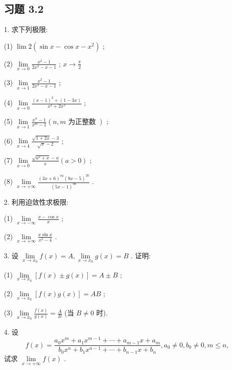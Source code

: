 \subsection{习题 3.2}

1. 求下列极限:

(1) \(\lim 2\left( {\sin x - \cos x - {x}^{2}}\right)\) ;

(2) \(\mathop{\lim }\limits_{{x \rightarrow  0}}\frac{{x}^{2} - 1}{2{x}^{2} - x - 1}\) ; \(x \rightarrow  \frac{\pi }{2}\)

(3) \(\mathop{\lim }\limits_{{x \rightarrow  1}}\frac{{x}^{2} - 1}{2{x}^{2} - x - 1}\) ;

(4) \(\mathop{\lim }\limits_{{x \rightarrow  0}}\frac{{\left( x - 1\right) }^{3} + \left( {1 - {3x}}\right) }{{x}^{2} + 2{x}^{3}}\) ;

(5) \(\mathop{\lim }\limits_{{x \rightarrow  1}}\frac{{x}^{n} - 1}{{x}^{m} - 1}\left( {n,m\text{ 为正整数 }}\right)\) ;

(6) \(\mathop{\lim }\limits_{{x \rightarrow  4}}\frac{\sqrt{1 + {2x}} - 3}{\sqrt{x} - 2}\) ;

(7) \(\mathop{\lim }\limits_{{x \rightarrow  0}}\frac{\sqrt{{a}^{2} + x} - a}{x}\left( {a > 0}\right)\) ;

(8) \(\mathop{\lim }\limits_{{x \rightarrow   + \infty }}\frac{{\left( 3x + 6\right) }^{70}{\left( 8x - 5\right) }^{20}}{{\left( 5x - 1\right) }^{90}}\) .

2. 利用迫敛性求极限:

(1) \(\mathop{\lim }\limits_{{x \rightarrow   - \infty }}\frac{x - \cos x}{x}\) ;

(2) \(\mathop{\lim }\limits_{{x \rightarrow   + \infty }}\frac{x\sin x}{{x}^{2} - 4}\) .

3. 设 \(\mathop{\lim }\limits_{{x \rightarrow  {x}_{0}}}f\left( x\right)  = A,\mathop{\lim }\limits_{{x \rightarrow  {x}_{0}}}g\left( x\right)  = B\) . 证明:

(1) \(\mathop{\lim }\limits_{{x \rightarrow  {x}_{0}}}\left\lbrack  {f\left( x\right)  \pm  g\left( x\right) }\right\rbrack   = A \pm  B\) ;

(2) \(\mathop{\lim }\limits_{{x \rightarrow  {x}_{0}}}\left\lbrack  {f\left( x\right) g\left( x\right) }\right\rbrack   = {AB}\) ;

(3) \(\mathop{\lim }\limits_{{x \rightarrow  {x}_{0}}}\frac{f\left( x\right) }{g\left( x\right) } = \frac{A}{B}\) (当 \(B \neq  0\) 时).

4. 设
\[
f\left( x\right)  = \frac{{a}_{0}{x}^{m} + {a}_{1}{x}^{m - 1} + \cdots  + {a}_{m - 1}x + {a}_{m}}{{b}_{0}{x}^{n} + {b}_{1}{x}^{n - 1} + \cdots  + {b}_{n - 1}x + {b}_{n}},{a}_{0} \neq  0,{b}_{0} \neq  0,m \leq  n,
\]
试求 \(\mathop{\lim }\limits_{{x \rightarrow   + \infty }}f\left( x\right)\) .

